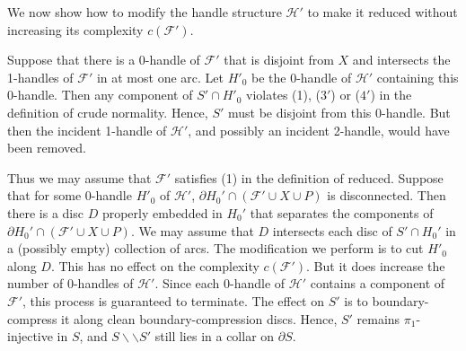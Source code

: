 \documentclass[oneside]{amsart}
\numberwithin{equation}{section}
\theoremstyle{plain}
\theoremstyle{definition}
\newcommand{\cut}{\backslash\backslash}
\begin{document}
We now show how to modify the handle structure $\mathcal{H}'$ to make it reduced without increasing its complexity $c(\mathcal{F}')$.

Suppose that there is a 0-handle of $\mathcal{F}'$ that
is disjoint from $X$ and intersects the 1-handles of $\mathcal{F}'$ in at most one arc.
Let $H'_0$ be the 0-handle of $\mathcal{H}'$ containing this 0-handle.
Then any component of $S' \cap H'_0$ violates (1), ($3'$) or ($4'$) in the definition of crude normality.
Hence, $S'$ must be disjoint from this 0-handle. But then the incident 1-handle of $\mathcal{H}'$,
and possibly an incident 2-handle, would have been removed.

Thus we may assume that $\mathcal{F}'$ satisfies (1) in the definition of reduced.
Suppose that for some 0-handle $H'_0$ of $\mathcal{H}'$, $\partial H_0' \cap (\mathcal{F}' \cup X \cup P)$
is disconnected. Then there is a disc $D$ properly embedded in $H_0'$ that separates the components of
$\partial H_0' \cap (\mathcal{F}' \cup X \cup P)$. We may assume that $D$
intersects each disc of $S' \cap H_0'$ in a (possibly empty) collection of arcs. The modification we
perform is to cut $H'_0$ along $D$. This has no effect on the complexity $c(\mathcal{F}')$.
But it does increase the number of 0-handles of $\mathcal{H}'$. Since each 0-handle of
$\mathcal{H}'$ contains a component of $\mathcal{F}'$, this process is guaranteed to terminate.
The effect on $S'$ is to boundary-compress it along clean boundary-compression discs.
Hence, $S'$ remains $\pi_1$-injective in $S$,
and $S \cut S'$ still lies in a collar on $\partial S$.
\end{document}
